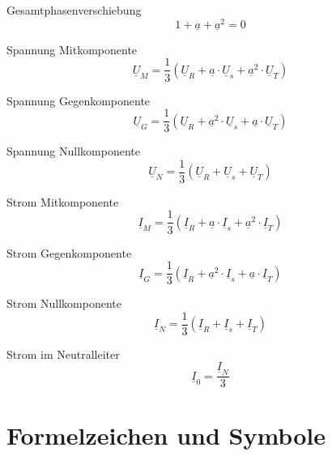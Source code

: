 \documentclass[11pt, a4paper, final, fleqn, twocolumn]{article}
\numberwithin{equation}{subsection}
\begin{document}
\noindent Gesamtphasenverschiebung
\begin{equation}
    1 + \underline{a} + \underline{a}^2 = 0
\end{equation}

\noindent Spannung Mitkomponente
\begin{equation}
    \underline{U}_M = \frac{1}{3}(\underline{U}_R + \underline{a} \cdot \underline{U}_s + \underline{a}^2 \cdot \underline{U}_T)
\end{equation}

\noindent Spannung Gegenkomponente
\begin{equation}
    \underline{U}_G = \frac{1}{3}(\underline{U}_R + \underline{a}^2 \cdot \underline{U}_s + \underline{a} \cdot \underline{U}_T)
\end{equation}

\noindent Spannung Nullkomponente
\begin{equation}
    \underline{U}_N = \frac{1}{3}(\underline{U}_R + \underline{U}_s + \underline{U}_T)
\end{equation}

\noindent Strom Mitkomponente
\begin{equation}
    \underline{I}_M = \frac{1}{3}(\underline{I}_R + \underline{a} \cdot \underline{I}_s + \underline{a}^2 \cdot \underline{I}_T)
\end{equation}

\noindent Strom Gegenkomponente
\begin{equation}
    \underline{I}_G = \frac{1}{3}(\underline{I}_R + \underline{a}^2 \cdot \underline{I}_s + \underline{a} \cdot \underline{I}_T)
\end{equation}

\noindent Strom Nullkomponente
\begin{equation}
    \underline{I}_N = \frac{1}{3}(\underline{I}_R + \underline{I}_s + \underline{I}_T)
\end{equation}

\noindent Strom im Neutralleiter
\begin{equation}
    \underline{I}_0 = \frac{\underline{I}_N}{3}
\end{equation}



\section{Formelzeichen und Symbole}
\end{document}
